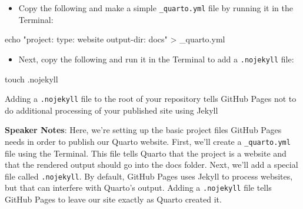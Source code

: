 \documentclass[
  letterpaper,
  DIV=11,
  numbers=noendperiod]{scrartcl}
\newenvironment{Shaded}{\begin{snugshade}}{\end{snugshade}}
\newcommand{\NormalTok}[1]{\textcolor[rgb]{0.00,0.23,0.31}{#1}}
\providecommand{\tightlist}{%
  \setlength{\itemsep}{0pt}\setlength{\parskip}{0pt}}
\begin{document}
\begin{itemize}
\tightlist
\item[$\square$]
  Copy the following and make a simple \texttt{\_quarto.yml} file by
  running it in the Terminal:
\end{itemize}

\begin{Shaded}
\begin{Highlighting}[]
\NormalTok{echo "project:}
\NormalTok{  type: website}
\NormalTok{  output{-}dir: docs" \textgreater{} \_quarto.yml}
\end{Highlighting}
\end{Shaded}

\begin{itemize}
\tightlist
\item[$\square$]
  Next, copy the following and run it in the Terminal to add a
  \texttt{.nojekyll} file:
\end{itemize}

\begin{Shaded}
\begin{Highlighting}[]
\NormalTok{touch .nojekyll}
\end{Highlighting}
\end{Shaded}

\begin{tcolorbox}[enhanced jigsaw, opacitybacktitle=0.6, toptitle=1mm, colbacktitle=quarto-callout-note-color!10!white, toprule=.15mm, left=2mm, colback=white, colframe=quarto-callout-note-color-frame, opacityback=0, bottomtitle=1mm, breakable, titlerule=0mm, rightrule=.15mm, arc=.35mm, title=\textcolor{quarto-callout-note-color}{\faInfo}\hspace{0.5em}{Why we add \texttt{.nojekyll}}, bottomrule=.15mm, coltitle=black, leftrule=.75mm]

Adding a \texttt{.nojekyll} file to the root of your repository tells
GitHub Pages not to do additional processing of your published site
using Jekyll

\end{tcolorbox}

\textbf{Speaker Notes}: Here, we're setting up the basic project files
GitHub Pages needs in order to publish our Quarto website. First, we'll
create a \texttt{\_quarto.yml} file using the Terminal. This file tells
Quarto that the project is a website and that the rendered output should
go into the docs folder. Next, we'll add a special file called
\texttt{.nojekyll}. By default, GitHub Pages uses Jekyll to process
websites, but that can interfere with Quarto's output. Adding a
\texttt{.nojekyll} file tells GitHub Pages to leave our site exactly as
Quarto created it.
\end{document}
